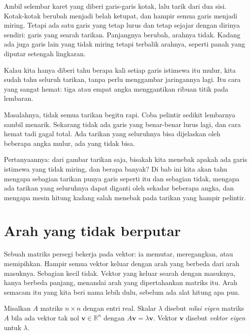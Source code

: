 \begin{untukanak}
Ambil selembar karet yang diberi garis-garis kotak, lalu tarik dari dua sisi. Kotak-kotak berubah
menjadi belah ketupat, dan hampir semua garis menjadi miring. Tetapi ada satu garis yang tetap
lurus dan tetap sejajar dengan dirinya sendiri: garis yang searah tarikan. Panjangnya berubah,
arahnya tidak. Kadang ada juga garis lain yang tidak miring tetapi terbalik arahnya, seperti
panah yang diputar setengah lingkaran.

Kalau kita hanya diberi tahu berapa kali setiap garis istimewa itu mulur, kita sudah tahu seluruh
tarikan, tanpa perlu menggambar jaringannya lagi. Itu cara yang sangat hemat: tiga atau empat
angka menggantikan ribuan titik pada lembaran.

Masalahnya, tidak semua tarikan begitu rapi. Coba pelintir sedikit lembarnya sambil menarik.
Sekarang tidak ada garis yang benar-benar lurus lagi, dan cara hemat tadi gagal total. Ada
tarikan yang seluruhnya bisa dijelaskan oleh beberapa angka mulur, ada yang tidak bisa.

Pertanyaannya: dari gambar tarikan saja, bisakah kita menebak apakah ada garis istimewa yang
tidak miring, dan berapa banyak? Di bab ini kita akan tahu mengapa sebagian tarikan punya garis
seperti itu dan sebagian tidak, mengapa ada tarikan yang seluruhnya dapat diganti oleh sekadar
beberapa angka, dan mengapa mesin hitung kadang salah menebak pada tarikan yang hampir pelintir.
\end{untukanak}

\section{Arah yang tidak berputar}

Sebuah matriks persegi bekerja pada vektor: ia memutar, meregangkan, atau memipihkan. Hampir
semua vektor keluar dengan arah yang berbeda dari arah masuknya. Sebagian kecil tidak. Vektor
yang keluar searah dengan masuknya, hanya berbeda panjang, menandai arah yang dipertahankan
matriks itu. Arah semacam itu yang kita beri nama lebih dulu, sebelum ada alat hitung apa pun.


\begin{definisi}
Misalkan $A$ matriks $n\times n$ dengan entri real. Skalar $\lambda$ disebut \emph{nilai eigen}
matriks $A$ bila ada vektor tak nol $\mathbf{v}\in\mathbb{R}^{n}$ dengan
$A\mathbf{v}=\lambda\mathbf{v}$. Vektor $\mathbf{v}$ disebut \emph{vektor eigen} untuk
$\lambda$.
\end{definisi}

